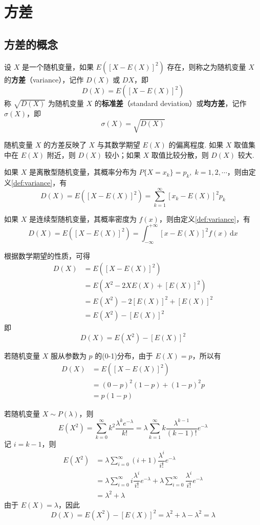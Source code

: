 \section{方差}

\subsection{方差的概念}

\begin{definition} \label{def:variance}
    设 $X$ 是一个随机变量，如果 $E([X-E(X)]^2)$ 存在，则称之为随机变量 $X$ 的\textbf{方差}（variance），记作 $D(X)$ 或 $DX$，即
    $$
    D(X) = E([X-E(X)]^2)
    $$
    称 $\sqrt{D(X)}$ 为随机变量 $X$ 的\textbf{标准差}（standard deviation）或\textbf{均方差}，记作 $\sigma(X)$，即
    $$
    \sigma(X) = \sqrt{D(X)}
    $$
\end{definition}

随机变量 $X$ 的方差反映了 $X$ 与其数学期望 $E(X)$ 的偏离程度. 如果 $X$ 取值集中在 $E(X)$ 附近，则 $D(X)$ 较小；如果 $X$ 取值比较分散，则 $D(X)$ 较大.

如果 $X$ 是离散型随机变量，其概率分布为 $P\{X=x_k\} = p_k, \; k=1,2,\cdots$，则由定义\ref{def:variance}，有
$$
D(X) = E([X-E(X)]^2) = \sum_{k=1}^{\infty} [x_k - E(X)]^2 p_k
$$

如果 $X$ 是连续型随机变量，其概率密度为 $f(x)$，则由定义\ref{def:variance}，有
$$
D(X) = E([X-E(X)]^2) = \int_{-\infty}^{+\infty} [x - E(X)]^2 f(x) \, \text{d}x
$$

根据数学期望的性质，可得
$$
\begin{aligned}
    D(X) &= E([X-E(X)]^2) \\
    &= E(X^2 - 2XE(X) + [E(X)]^2) \\
    &= E(X^2) - 2[E(X)]^2 + [E(X)]^2 \\
    &= E(X^2) - [E(X)]^2
\end{aligned}
$$
即
\begin{equation}
    D(X) = E(X^2) - [E(X)]^2
\end{equation}

若随机变量 $X$ 服从参数为 $p$ 的(0-1)分布，由于 $E(X)=p$，所以有
$$
\begin{aligned}
    D(X) &= E([X-E(X)]^2) \\
    &= (0-p)^2 (1-p) + (1-p)^2 p \\
    &= p(1-p)
\end{aligned}
$$

若随机变量 $X \sim P(\lambda)$，则
$$
E(X^2) = \sum_{k=0}^{\infty} k^2 \dfrac{\lambda^k e^{-\lambda}}{k!} = \lambda \sum_{k=1}^{\infty} k \dfrac{\lambda^{k-1}}{(k-1)!} e^{-\lambda}
$$
记 $i=k-1$，则
$$
\begin{aligned}
    E(X^2) &= \lambda \sum_{i=0}^{\infty} (i+1) \dfrac{\lambda^i}{i!} e^{-\lambda} \\
    &= \lambda \sum_{i=0}^{\infty} i \dfrac{\lambda^i}{i!} e^{-\lambda} + \lambda \sum_{i=0}^{\infty} \dfrac{\lambda^i}{i!} e^{-\lambda} \\
    &= \lambda^2 + \lambda
\end{aligned}
$$
由于 $E(X) = \lambda$，因此
$$
D(X) = E(X^2) - [E(X)]^2 = \lambda^2 + \lambda - \lambda^2 = \lambda
$$

